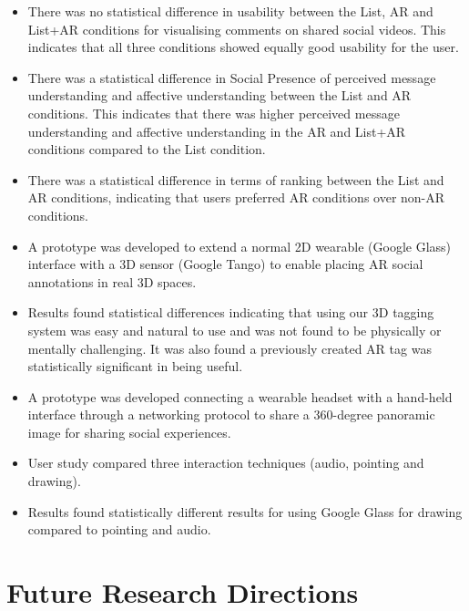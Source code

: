 \begin{itemize}
    \item{There was no statistical difference in usability between the List, AR and List+AR conditions for visualising comments on shared social videos. This indicates that all three conditions showed equally good usability for the user.}
    \item{There was a statistical difference in Social Presence of perceived message understanding and affective understanding between the List and AR conditions. This indicates that there was higher perceived message understanding and affective understanding in the AR and List+AR conditions compared to the List condition.}
    \item{There was a statistical difference in terms of ranking between the List and AR conditions, indicating that users preferred AR conditions over non-AR conditions.}
    \item{A prototype was developed to extend a normal 2D wearable (Google Glass) interface with a 3D sensor (Google Tango) to enable placing AR social annotations in real 3D spaces.}
    \item{Results found statistical differences indicating that using our 3D tagging system was easy and natural to use and was not found to be physically or mentally challenging. It was also found a previously created AR tag was statistically significant in being useful.}
    \item{A prototype was developed connecting a wearable headset with a hand-held interface through a networking protocol to share a 360-degree panoramic image for sharing social experiences.}
    \item{User study compared three interaction techniques (audio, pointing and drawing).}
    \item{Results found statistically different results for using Google Glass for drawing compared to pointing and audio.}
\end{itemize}



\section{Future Research Directions}

